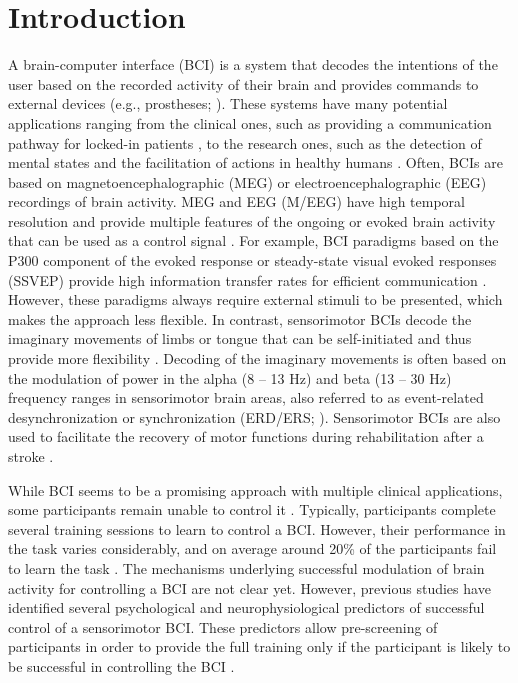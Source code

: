 \section{Introduction}

A brain-computer interface (BCI) is a system that decodes the intentions of the user based on the recorded activity of their brain and provides commands to external devices (e.g., prostheses; \cite{Wolpaw2002}). These systems have many potential applications ranging from the clinical ones, such as providing a communication pathway for locked-in patients \citep{Chaudhary2016}, to the research ones, such as the detection of mental states and the facilitation of actions in healthy humans \citep{Blankertz2010review, Blankertz2016}. Often, BCIs are based on magnetoencephalographic (MEG) or electroencephalographic (EEG) recordings of brain activity. MEG and EEG (M/EEG) have high temporal resolution and provide multiple features of the ongoing or evoked brain activity that can be used as a control signal \citep{Abiri2019}. For example, BCI paradigms based on the P300 component of the evoked response or steady-state visual evoked responses (SSVEP) provide high information transfer rates for efficient communication \citep{Abiri2019}. However, these paradigms always require external stimuli to be presented, which makes the approach less flexible. In contrast, sensorimotor BCIs decode the imaginary movements of limbs or tongue that can be self-initiated and thus provide more flexibility \citep{Leeb2007, YuanHe2014, Scherer2018}. Decoding of the imaginary movements is often based on the modulation of power in the alpha (8 -- 13 Hz) and beta (13 -- 30 Hz) frequency ranges in sensorimotor brain areas, also referred to as event-related desynchronization or synchronization (ERD/ERS; \cite{PfurtschellerLopesDaSilva1999, Pfurtscheller1996}). Sensorimotor BCIs are also used to facilitate the recovery of motor functions during rehabilitation after a stroke \citep{Cervera2018, Kruse2020, Peng2022}.

\medskip

While BCI seems to be a promising approach with multiple clinical applications, some participants remain unable to control it \citep{AllisonNeuper2010}. Typically, participants complete several training sessions to learn to control a BCI. However, their performance in the task varies considerably, and on average around 20\% of the participants fail to learn the task \citep{Sannelli2019}. The mechanisms underlying successful modulation of brain activity for controlling a BCI are not clear yet. However, previous studies have identified several psychological \citep{Hammer2012, Jeunet2015} and neurophysiological \citep{Blankertz2010, Sugata2014, Samek2016, Vidaurre2020} predictors of successful control of a sensorimotor BCI. These predictors allow pre-screening of participants in order to provide the full training only if the participant is likely to be successful in controlling the BCI \citep{Sannelli2019}. 

